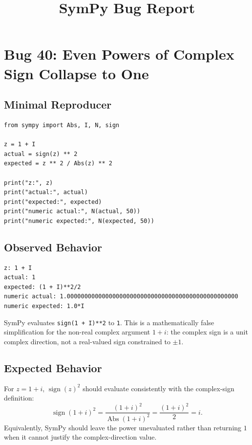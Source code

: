 \documentclass[11pt]{article}
\title{SymPy Bug Report}
\author{}
\date{}
\begin{document}
\maketitle

\section{Bug 40: Even Powers of Complex Sign Collapse to One}

\subsection{Minimal Reproducer}

\medskip

\begin{lstlisting}[style=bugpython]
from sympy import Abs, I, N, sign

z = 1 + I
actual = sign(z) ** 2
expected = z ** 2 / Abs(z) ** 2

print("z:", z)
print("actual:", actual)
print("expected:", expected)
print("numeric actual:", N(actual, 50))
print("numeric expected:", N(expected, 50))
\end{lstlisting}

\subsection{Observed Behavior}

\medskip

\begin{lstlisting}[style=bugpython]
z: 1 + I
actual: 1
expected: (1 + I)**2/2
numeric actual: 1.0000000000000000000000000000000000000000000000000
numeric expected: 1.0*I
\end{lstlisting}

SymPy evaluates \texttt{sign(1 + I)**2} to \texttt{1}. This is a mathematically false simplification for the non-real complex argument \(1+i\): the complex sign is a unit complex direction, not a real-valued sign constrained to \(\pm 1\).

\subsection{Expected Behavior}

For \(z = 1+i\), \(\operatorname{sign}(z)^2\) should evaluate consistently with the complex-sign definition:
\[
  \operatorname{sign}(1+i)^2
  = \frac{(1+i)^2}{\operatorname{Abs}(1+i)^2}
  = \frac{(1+i)^2}{2}
  = i.
\]
Equivalently, SymPy should leave the power unevaluated rather than returning \(1\) when it cannot justify the complex-direction value.
\end{document}
